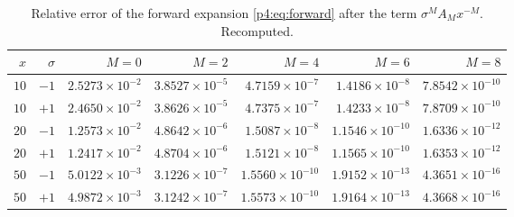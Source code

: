\documentclass[11pt,a4paper,oneside]{book}
\theoremstyle{plain}
\theoremstyle{definition}
\theoremstyle{remark}
\begin{document}
\begin{table}[htbp]
\centering
\caption{Relative error of the forward expansion \cref{p4:eq:forward} after
the term $\sigma^{M}A_Mx^{-M}$.  Recomputed.}
\label{p4:tab:forward-errors}
\small
\begin{tabular}{@{}rrrrrrr@{}}
\toprule
$x$&$\sigma$&$M=0$&$M=2$&$M=4$&$M=6$&$M=8$\\
\midrule
$10$&$-1$&$2.5273\!\times\!10^{-2}$&$3.8527\!\times\!10^{-5}$&$4.7159\!\times\!10^{-7}$&$1.4186\!\times\!10^{-8}$&$7.8542\!\times\!10^{-10}$\\
$10$&$+1$&$2.4650\!\times\!10^{-2}$&$3.8626\!\times\!10^{-5}$&$4.7375\!\times\!10^{-7}$&$1.4233\!\times\!10^{-8}$&$7.8709\!\times\!10^{-10}$\\
$20$&$-1$&$1.2573\!\times\!10^{-2}$&$4.8642\!\times\!10^{-6}$&$1.5087\!\times\!10^{-8}$&$1.1546\!\times\!10^{-10}$&$1.6336\!\times\!10^{-12}$\\
$20$&$+1$&$1.2417\!\times\!10^{-2}$&$4.8704\!\times\!10^{-6}$&$1.5121\!\times\!10^{-8}$&$1.1565\!\times\!10^{-10}$&$1.6353\!\times\!10^{-12}$\\
$50$&$-1$&$5.0122\!\times\!10^{-3}$&$3.1226\!\times\!10^{-7}$&$1.5560\!\times\!10^{-10}$&$1.9152\!\times\!10^{-13}$&$4.3651\!\times\!10^{-16}$\\
$50$&$+1$&$4.9872\!\times\!10^{-3}$&$3.1242\!\times\!10^{-7}$&$1.5573\!\times\!10^{-10}$&$1.9164\!\times\!10^{-13}$&$4.3668\!\times\!10^{-16}$\\
\bottomrule
\end{tabular}
\end{table}
\end{document}
